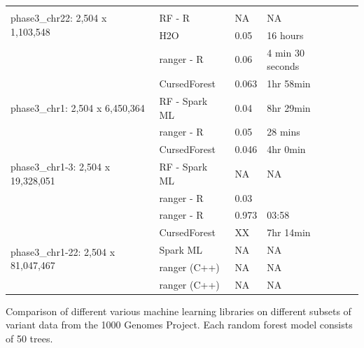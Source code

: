 \documentclass[10pt,letterpaper]{article}
\newcommand{\cursedforest}{{\sc CursedForest}}
\begin{document}
\begin{table}[!ht]
\begin{minipage}{\textwidth}
\begin{tabular}{|l|l|l|l|l|l||}
 \hline
\multirow{3}{*}{phase3\_chr22: 2,504 x 1,103,548}   &               &            &                  \\
                                                    & RF - R        & NA         & NA                \\
                                                    & H2O           & 0.05       & 16 hours         \\
                                                    & ranger - R    & 0.06       & 4 min 30 seconds     \\
\hline
\multirow{3}{*}{phase3\_chr1: 2,504 x 6,450,364}    & \cursedforest\ & 0.063  & 1hr 58min         \\
                                                    & RF - Spark ML  & 0.04       & 8hr 29min        \\
                                                    & ranger - R      &  0.05       & 28 mins         \\
\hline
\multirow{3}{*}{phase3\_chr1-3: 2,504 x 19,328,051} & \cursedforest\ & 0.046  & 4hr 0min               \\
                                                    & RF - Spark ML  &    NA         &   NA               \\
                                                    & ranger - R      & 0.03      &         \\
& ranger - R        &             0.973     &      03:58           \\
\hline

\multirow{4}{*}{phase3\_chr1-22: 2,504 x 81,047,467} & \cursedforest\ & XX  & 7hr 14min \\
& Spark ML & NA & NA  \\
& ranger (C++)       &        NA     &        NA      \\
& ranger (C++)       &        NA     &        NA    \\
\hline
\end{tabular}
\begin{flushleft} 
Comparison of different various machine learning libraries on different subsets of variant data 
from the 1000 Genomes Project.
Each random forest model consists of 50 trees.
\end{flushleft}
\label{timingtable}
\end{minipage}
\end{table}

\end{document}
